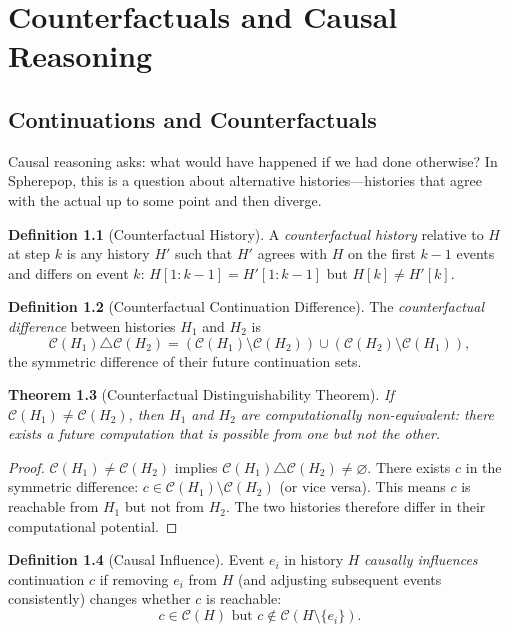 \documentclass[12pt, a4paper, openany]{book}
\theoremstyle{plain}
\newtheorem{theorem}{Theorem}[chapter]
\theoremstyle{definition}
\newtheorem{definition}[theorem]{Definition}
\theoremstyle{remark}
\newcommand{\calC}{\mathcal{C}}
\begin{document}
\chapter{Counterfactuals and Causal Reasoning}

\section{Continuations and Counterfactuals}

Causal reasoning asks: what would have happened if we had done otherwise? In
Spherepop, this is a question about alternative histories---histories that agree
with the actual up to some point and then diverge.

\begin{definition}[Counterfactual History]
A \emph{counterfactual history} relative to $H$ at step $k$ is any history
$H'$ such that $H'$ agrees with $H$ on the first $k-1$ events and differs on
event $k$: $H[1:k-1] = H'[1:k-1]$ but $H[k] \neq H'[k]$.
\end{definition}

\begin{definition}[Counterfactual Continuation Difference]
The \emph{counterfactual difference} between histories $H_1$ and $H_2$ is
\[
\calC(H_1) \triangle \calC(H_2) = (\calC(H_1) \setminus \calC(H_2)) \cup (\calC(H_2) \setminus \calC(H_1)),
\]
the symmetric difference of their future continuation sets.
\end{definition}

\begin{theorem}[Counterfactual Distinguishability Theorem]
If $\calC(H_1) \neq \calC(H_2)$, then $H_1$ and $H_2$ are computationally
non-equivalent: there exists a future computation that is possible from one
but not the other.
\end{theorem}

\begin{proof}
$\calC(H_1) \neq \calC(H_2)$ implies $\calC(H_1) \triangle \calC(H_2) \neq \varnothing$.
There exists $c$ in the symmetric difference: $c \in \calC(H_1) \setminus \calC(H_2)$
(or vice versa). This means $c$ is reachable from $H_1$ but not from $H_2$.
The two histories therefore differ in their computational potential.
\end{proof}

\begin{definition}[Causal Influence]
Event $e_i$ in history $H$ \emph{causally influences} continuation $c$ if
removing $e_i$ from $H$ (and adjusting subsequent events consistently) changes
whether $c$ is reachable:
\[
c \in \calC(H) \text{ but } c \notin \calC(H \setminus \{e_i\}).
\]
\end{definition}
\end{document}
